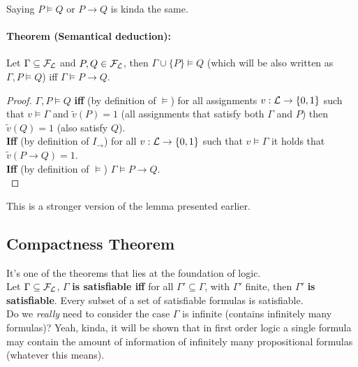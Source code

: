 \documentclass[11pt]{article}
\begin{document}
	Saying $P \models Q$ or $P \rightarrow Q$ is kinda the same.\\
	
	\paragraph{Theorem (Semantical deduction):} Let $\Gamma \subseteq \mathcal{F}_\mathcal{L}$ and $P,Q \in \mathcal{F}_\mathcal{L}$, then $\Gamma \cup \{P\} \models Q$ (which will be also written as $\Gamma, P \models Q$) iff $\Gamma \models P \rightarrow Q$.\\
	
	\begin{proof}
		$\Gamma, P \models Q$ \textbf{iff} (by definition of $\models$) for all assignments $v: \mathcal{L} \rightarrow \{0,1\}$ such that $v \models \Gamma$ and $\tilde{v}(P) = 1$ (all assignments that satisfy both $\Gamma$ and $P$) then $\tilde{v}(Q) = 1$ (also satisfy $Q$).\\
		
		\textbf{Iff} (by definition of $I_\rightarrow$) for all $v: \mathcal{L} \rightarrow \{0,1\}$ such that $v \models \Gamma$ it holds that $\tilde{v}(P \rightarrow Q) =1$.\\
		
		\textbf{Iff} (by definition of $\models$) $\Gamma \models P \rightarrow Q$.\\
	\end{proof}
	
	This is a stronger version of the lemma presented earlier.\\
	
	\newpage
	
	\subsection{Compactness Theorem}
	It's one of the theorems that lies at the foundation of logic. \\
	
	Let $\Gamma \subseteq \mathcal{F}_\mathcal{L}$, $\Gamma$ \textbf{is satisfiable iff} for all $\Gamma' \subseteq \Gamma$, with $\Gamma'$ finite, then $\Gamma'$ \textbf{is satisfiable}. Every subset of a set of satisfiable formulas is satisfiable.\\
	
	Do we \textit{really} need to consider the case $\Gamma$ is infinite (contains infinitely many formulas)? Yeah, kinda, it will be shown that in first order logic a single formula may contain the amount of information of infinitely many propositional formulas (whatever this means).\\
	
\end{document}
